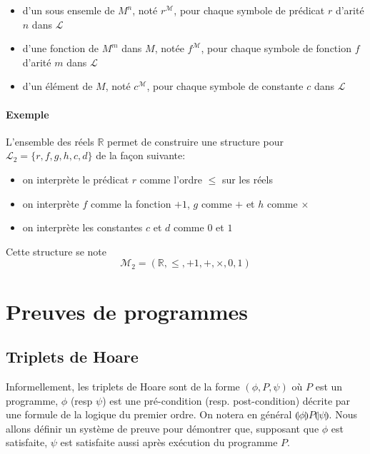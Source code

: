 \documentclass[a4paper]{article}
\begin{document}
   \begin{itemize}
     \item d'un sous ensemle de $M^n$, noté $r^{\mathcal{M}}$, pour chaque symbole
     de prédicat $r$ d'arité $n$ dans $\mathcal{L}$
     \item d'une fonction de $M^m$ dans $M$, notée $f^{\mathcal{M}}$, pour chaque symbole
     de fonction $f$ d'arité $m$ dans $\mathcal{L}$
     \item d'un élément de $M$, noté $c^{\mathcal{M}}$, pour chaque symbole de 
     constante $c$ dans $\mathcal{L}$
   \end{itemize}

   \paragraph{Exemple} L'ensemble des réels $\mathbb{R}$ permet de construire une 
   structure pour $\mathcal{L}_2 = \{r, f, g, h, c, d\}$ de la façon suivante:

   \begin{itemize}
     \item on interprète le prédicat $r$ comme l'ordre $\leq$ sur les réels
     \item on interprète $f$ comme la fonction $+1$, $g$ comme $+$ et $h$ comme $\times$
     \item on interprète les constantes $c$ et $d$ comme $0$ et $1$
   \end{itemize}
   Cette structure se note $$ \mathcal{M}_2 = (\mathbb{R}, \leq, +1, +, \times, 0, 1) $$ 


\section{Preuves de programmes}
  \subsection{Triplets de Hoare}
  Informellement, les triplets de Hoare sont de la forme $(\phi, P, \psi)$ où $P$
  est un programme, $\phi$ (resp $\psi$) est une pré-condition (resp. post-condition) 
  décrite par une formule de la logique du premier ordre. On notera en général $\llparenthesis \phi\rrparenthesis P \llparenthesis \psi\rrparenthesis $.
  Nous allons définir un système de preuve pour démontrer que, supposant que $\phi$
  est satisfaite, $\psi$ est satisfaite aussi après exécution du programme $P$.
\end{document}
